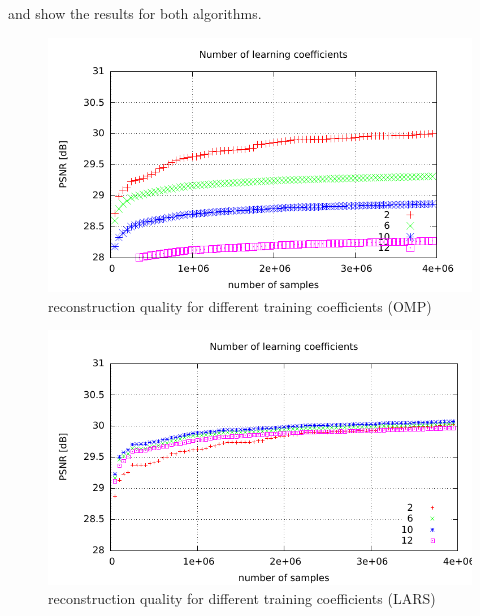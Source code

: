  and  show the results for
both algorithms.

\newpage
\begin{figure}[H]
\centering
\includegraphics[width =
1.0\textwidth]{../tests/results/coeffsConvergOMP.pdf}
\caption{reconstruction quality for different training coefficients (OMP)}
\label{fig:coeffsOMP}
\end{figure}

\begin{figure}[H]
\centering
\includegraphics[width = 1.0\textwidth]{../tests/results/coeffsConverg.pdf}
\caption{reconstruction quality for different training coefficients (LARS)}
\label{fig:coeffsLasso}
\end{figure}




